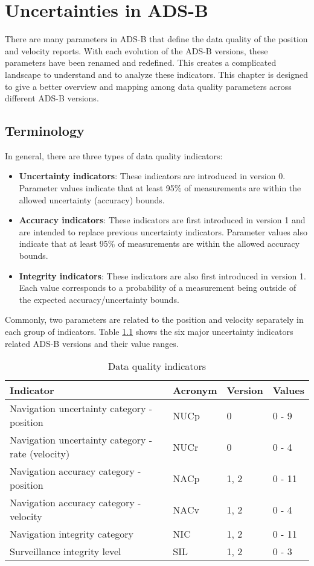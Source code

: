 \chapter{Uncertainties in ADS-B} \label{chap:uncertainty}

There are many parameters in ADS-B that define the data quality of the position and velocity reports. With each evolution of the ADS-B versions, these parameters have been renamed and redefined. This creates a complicated landscape to understand and to analyze these indicators. This chapter is designed to give a better overview and mapping among data quality parameters across different ADS-B versions.

\section{Terminology}
In general, there are three types of data quality indicators:

\begin{itemize}
  \item \textbf{Uncertainty indicators}: These indicators are introduced in version 0. Parameter values indicate that at least 95\% of measurements are within the allowed uncertainty (accuracy) bounds.
  \item \textbf{Accuracy indicators}: These indicators are first introduced in version 1 and are intended to replace previous uncertainty indicators. Parameter values also indicate that at least 95\% of measurements are within the allowed accuracy bounds.
  \item \textbf{Integrity indicators}: These indicators are also first introduced in version 1. Each value corresponds to a probability of a measurement being outside of the expected accuracy/uncertainty bounds.
\end{itemize}

Commonly, two parameters are related to the position and velocity separately in each group of indicators. Table \ref{tb:measurement-quality-indicators} shows the six major uncertainty indicators related ADS-B versions and their value ranges.

\begin{table}[ht]
\caption{Data quality indicators}
\label{tb:measurement-quality-indicators}
\begin{tabular}{|l|l|l|l|}
\hline
\textbf{Indicator} & \textbf{Acronym} & \textbf{Version} & \textbf{Values} \\ \hline
Navigation uncertainty category - position & NUCp & 0 & 0 - 9 \\ \hline
Navigation uncertainty category - rate (velocity) & NUCr & 0 & 0 - 4 \\ \hline
Navigation accuracy category - position & NACp & 1, 2 & 0 - 11 \\ \hline
Navigation accuracy category - velocity & NACv & 1, 2 & 0 - 4 \\ \hline
Navigation integrity category & NIC & 1, 2 & 0 - 11 \\ \hline
Surveillance integrity level & SIL & 1, 2 & 0 - 3 \\ \hline
\end{tabular}
\end{table}

